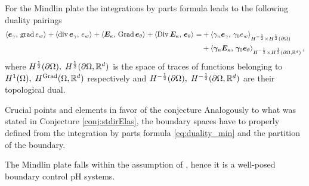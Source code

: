 \begin{remark}\label{rmk:duality_min}
	For the Mindlin plate the integrations by parts formula leads to the following duality pairings 
	\begin{equation}\label{eq:duality_min}
	\begin{aligned}
	\inner{\bm{e}_\gamma}{\grad {e}_w} + \inner{\div \bm{e}_\gamma}{e_w} +  \inner{\bm{E}_\kappa}{\Grad \bm{e}_\theta} + \inner{\Div \bm{E}_\kappa}{\bm{e}_\theta} = &+\inner[H^{-\frac{1}{2}} \times H^{\frac{1}{2}}(\partial\Omega)]{\gamma_{n}\bm{e}_\gamma}{\gamma_{0} {e}_w} \\
	&+\inner[H^{-\frac{1}{2}} \times H^{\frac{1}{2}}(\partial\Omega, \bbR^d)]{\bm\gamma_{n}\bm{E}_\kappa}{\bm\gamma_{0} \bm{e}_\theta}, \\
	\end{aligned}
	\end{equation}
	where $H^{\frac{1}{2}}(\partial\Omega), \; H^{\frac{1}{2}}(\partial\Omega, \bbR^d)$ is the space of traces of functions belonging to $H^{1}(\Omega), \; H^{\Grad}(\Omega, \bbR^d)$ respectively and $H^{-\frac{1}{2}}(\partial\Omega), \; H^{-\frac{1}{2}}(\partial\Omega, \bbR^d)$ are their topological dual.
\end{remark}


\begin{paragraph}{Crucial points and elements in favor of the conjecture}
	Analogously to what was stated in Conjecture \ref{conj:stdirElas}, the boundary spaces have to properly defined from the integration by parts formula \eqref{eq:duality_min} and the partition of the boundary.
\end{paragraph}

The Mindlin plate falls within the assumption of \cite{skrepek2019wellposedness}, hence it is a well-posed boundary control pH systems.
	

